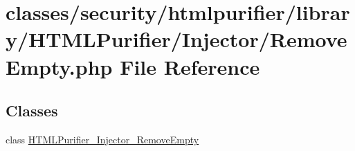 \hypertarget{RemoveEmpty_8php}{\section{classes/security/htmlpurifier/library/\+H\+T\+M\+L\+Purifier/\+Injector/\+Remove\+Empty.php File Reference}
\label{RemoveEmpty_8php}
}
\subsection*{Classes}
\begin{DoxyCompactItemize}
\item 
class \hyperlink{classHTMLPurifier__Injector__RemoveEmpty}{H\+T\+M\+L\+Purifier\+\_\+\+Injector\+\_\+\+Remove\+Empty}
\end{DoxyCompactItemize}
